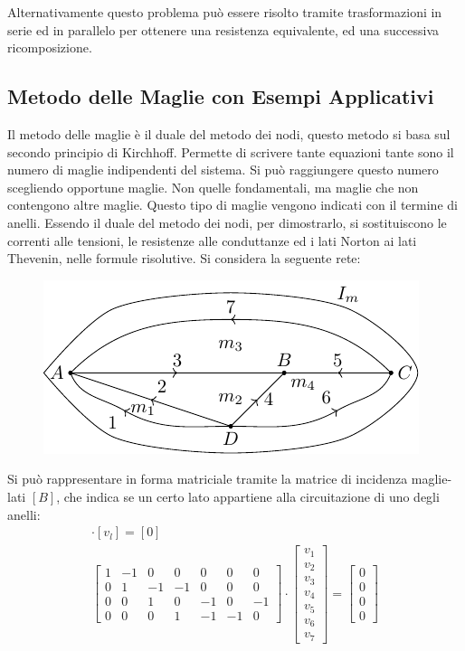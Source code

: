 \documentclass{article}
\numberwithin{equation}{subsection}
\begin{document}
Alternativamente questo problema può essere risolto tramite trasformazioni in serie ed in parallelo per ottenere una resistenza equivalente, ed una successiva ricomposizione. 

\subsection{Metodo delle Maglie con Esempi Applicativi}

Il metodo delle maglie è il duale del metodo dei nodi, questo metodo si basa sul secondo principio di Kirchhoff. Permette di scrivere tante equazioni tante sono il numero di 
maglie indipendenti del sistema. Si può raggiungere questo numero scegliendo opportune maglie. Non quelle fondamentali, ma maglie che non contengono altre maglie. Questo 
tipo di maglie vengono indicati con il termine di anelli. Essendo il duale del metodo dei nodi, per dimostrarlo, si sostituiscono le correnti alle tensioni, le resistenze alle 
conduttanze ed i lati Norton ai lati Thevenin, nelle formule risolutive. 
Si considera la seguente rete:
\begin{figure}[H]%
    \centering
    \includegraphics{maglia-riferimento.pdf}%
    \label{fig:maglia-riferimento}
\end{figure}

Si può rappresentare in forma matriciale tramite la matrice di incidenza maglie-lati $[B]$, che  indica se un certo lato appartiene alla circuitazione di uno degli anelli:
\begin{gather*}
    [B]\cdot[v_l]=[0]\\
    \begin{bmatrix}
        1&-1&0&0&0&0&0\\
        0&1&-1&-1&0&0&0\\
        0&0&1&0&-1&0&-1\\
        0&0&0&1&-1&-1&0
    \end{bmatrix}\cdot\begin{bmatrix}
        v_1\\v_2\\v_3\\v_4\\v_5\\v_6\\v_7
    \end{bmatrix}=\begin{bmatrix}
        0\\0\\0\\0
    \end{bmatrix}
\end{gather*}
\end{document}
